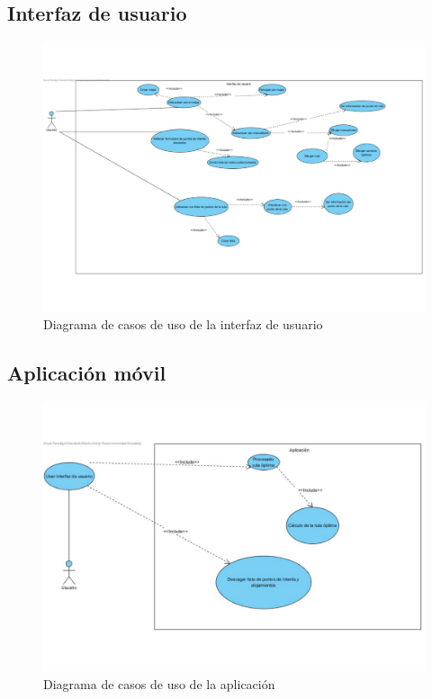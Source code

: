 \subsection[Interfaz de usuario]{Interfaz de usuario}
\begin{figure}[H]
	\centering
	\includegraphics[scale=0.5]{imagenes/Interfaz.pdf}
	\caption{Diagrama de casos de uso de la interfaz de usuario}
	\label{fig:user_interface}
\end{figure}

\subsection[Aplicación]{Aplicación móvil}
\begin{figure}[H]
	\centering
	\includegraphics[scale=0.55]{imagenes/Aplicacion.pdf}
	\caption{Diagrama de casos de uso de la aplicación}
	\label{fig:app}
\end{figure}

